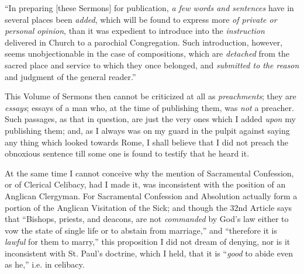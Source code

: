 ``In preparing [these Sermons] for publication, \emph{a few words and sentences} have in
several places been \emph{added}, which will be found to express more \emph{of
private or personal opinion}, than it was expedient to
introduce into the \emph{instruction} delivered in Church to a parochial
Congregation. Such introduction, however, seems unobjectionable in the
case of compositions, which are \emph{detached} from the sacred place
and service to which they once belonged, and \emph{submitted to the reason}
and judgment of the general reader.''

This Volume of Sermons then cannot be criticized at all as \emph{preachments};
they are \emph{essays}; essays of a man who, at the time of publishing
them, was \emph{not} a preacher. Such passages, as that in question, are
just the very ones which I added \emph{upon} my publishing them; and, as I always was on my guard in the pulpit
against saying any thing which looked towards Rome, I shall believe
that I did not preach the obnoxious sentence till some one is found to
testify that he heard it.

At the same time I cannot conceive why the mention of Sacramental
Confession, or of Clerical Celibacy, had I made it, was inconsistent
with the position of an Anglican Clergyman. For Sacramental Confession
and Absolution actually form a portion of the Anglican Visitation of the
Sick; and though the 32nd Article says that ``Bishops, priests, and
deacons, are not \emph{commanded} by God's law either to vow the state
of single life or to abstain from marriage,'' and ``therefore it is \emph{lawful}
for them to marry,'' this proposition I did not dream of denying,
nor is it inconsistent with St. Paul's doctrine, which I held, that it
is ``\emph{good} to abide even as he,'' i.e. in celibacy.

